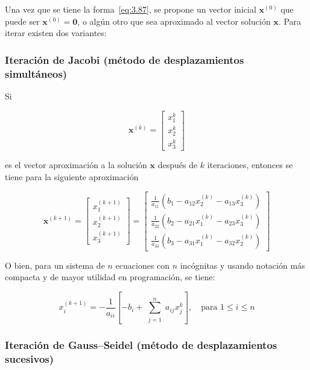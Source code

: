 \documentclass[12pt,letterpaper]{article}
\theoremstyle{definition}
\theoremstyle{plain}
\theoremstyle{remark}
\begin{document}
Una vez que se tiene la forma~\eqref{eq:3.87}, se propone un vector inicial $\mathbf{x}^{(0)}$ que puede ser $\mathbf{x}^{(0)} = \mathbf{0}$, o algún otro que sea aproximado al vector solución $\mathbf{x}$. Para iterar existen dos variantes:

\subsubsection{Iteración de Jacobi (método de desplazamientos simultáneos)}

Si

\begin{equation}
\mathbf{x}^{(k)} = 
\begin{bmatrix}
x_1^{k} \\
x_2^{k} \\
x_3^{k}
\end{bmatrix}
\label{eq:3.88}
\tag{8}
\end{equation}

es el vector aproximación a la solución $\mathbf{x}$ después de $k$ iteraciones, entonces se tiene para la siguiente aproximación

\begin{equation}
\mathbf{x}^{(k+1)} =
\begin{bmatrix}
x_1^{(k+1)} \\
x_2^{(k+1)} \\
x_3^{(k+1)}
\end{bmatrix}
=
\begin{bmatrix}
\frac{1}{a_{11}} (b_1 - a_{12} x_2^{(k)} - a_{13} x_3^{(k)}) \\
\frac{1}{a_{22}} (b_2 - a_{21} x_1^{(k)} - a_{23} x_3^{(k)}) \\
\frac{1}{a_{33}} (b_3 - a_{31} x_1^{(k)} - a_{32} x_2^{(k)})
\end{bmatrix}
\label{eq:3.89}
\tag{9}
\end{equation}

O bien, para un sistema de $n$ ecuaciones con $n$ incógnitas y usando notación más compacta y de mayor utilidad en programación, se tiene:

\begin{equation}
x_i^{(k+1)} = -\frac{1}{a_{ii}} \left[ -b_i + \sum_{\substack{j=1}}^{n} a_{ij} x_j^{k} \right], \quad \text{para } 1 \leq i \leq n
\label{eq:3.90}
\tag{10}
\end{equation}

\subsubsection{Iteración de Gauss–Seidel (método de desplazamientos sucesivos)}
\end{document}
